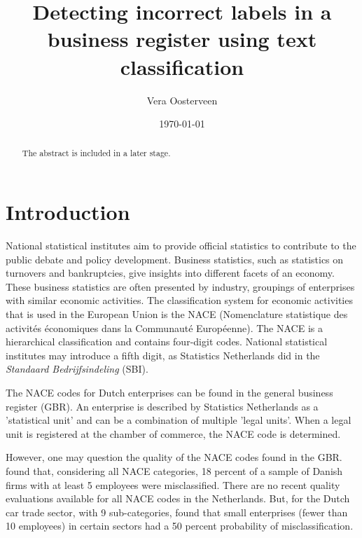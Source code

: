 \documentclass[12pt, a4paper, titlepage]{article}
\begin{document}
\title{Detecting incorrect labels in a business register using text classification}
\author{Vera Oosterveen \\   }
\date{\today}
\maketitle

							\begin{abstract}
							The abstract is included in a later stage.
							\end{abstract}


							\section{Introduction}
							\label{section:intro}

National statistical institutes aim to provide official statistics to contribute to the public debate and policy development. Business statistics, such as statistics on turnovers and bankruptcies, give insights into different facets of an economy. These business statistics are often presented by industry, groupings of enterprises with similar economic activities. The classification system for economic activities that is used in the European Union is the NACE (Nomenclature statistique des activités économiques dans la Communauté Européenne). The NACE is a hierarchical classification and contains four-digit codes. National statistical institutes may introduce a fifth digit, as Statistics Netherlands did in the \textit{Standaard Bedrijfsindeling} (SBI).

The NACE codes for Dutch enterprises can be found in the general business register (GBR). An enterprise is described by Statistics Netherlands as a 'statistical unit' and can be a combination of multiple 'legal units'. When a legal unit is registered at the chamber of commerce, the NACE code is determined. 

However, one may question the quality of the NACE codes found in the GBR. \citet{Christensen2008} found that, considering all NACE categories, 18 percent of a sample of Danish firms with at least 5 employees were misclassified. There are no recent quality evaluations available for all NACE codes in the Netherlands. But, for the Dutch car trade sector, with 9 sub-categories, \citet{DeldenScholtusBurger} found that small enterprises (fewer than 10 employees) in certain sectors had a 50 percent probability of misclassification.
\end{document}

